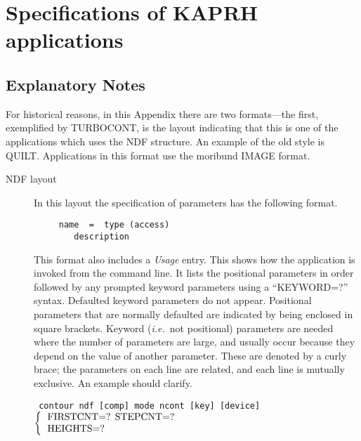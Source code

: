 \documentclass[twoside,11pt]{article}
\newcommand{\htmlref}[2]{#1}
\newcommand{\xlabel}[1]{}
\newcommand{\ssttt}{\tt}
\begin{document}
\newpage
\section{\xlabel{ap_full}Specifications of KAPRH applications\label{ap:full}}
\subsection{Explanatory Notes}
For historical reasons, in this Appendix there are two formats---the
first, exemplified by \htmlref{TURBOCONT}{TURBOCONT}, is the layout indicating
that this is one of the applications which uses the NDF structure. An
example of the old style is \htmlref{QUILT}{QUILT}.  Applications
in this format use the moribund \htmlref{IMAGE format}{ap:IMAGEformat}.

\begin{description}
\item [NDF layout]
In this layout the specification of parameters has the following
format.

\begin{verbatim}
     name  =  type (access)
        description
\end{verbatim}
This format also includes a {\em Usage\/} entry.  \label{ap:usage}
This shows how the application is invoked from the command line.  It
lists the positional parameters in order followed by any prompted
keyword parameters using a \mbox{``KEYWORD=?''} syntax.  Defaulted
keyword parameters do not appear.  Positional parameters that are
normally defaulted are indicated by being enclosed in square brackets.
Keyword ({\it{i.e.}}\ not positional) parameters are needed where the
number of parameters are large, and usually occur because they depend
on the value of another parameter.  These are denoted by a curly
brace; the parameters on each line are related, and each line is
mutually exclusive.  An example should clarify.
\bigskip

{\ssttt \hspace*{1.0em}
        contour ndf [comp] mode ncont [key] [device]
        \newline\hspace*{2.5em}
        $\left\{ {\begin{tabular}{l}
                    FIRSTCNT=? STEPCNT=? \\
                    HEIGHTS=?
                   \end{tabular} }
        \right.$
        \newline\hspace*{2.9em}
}
\bigskip


\end{description}
\end{document}
